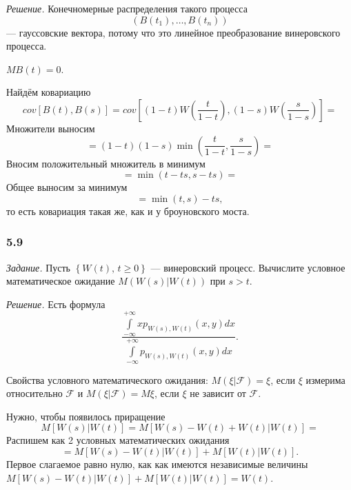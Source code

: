 \textit{Решение.}
Конечномерные распределения такого процесса
$$ \left( B \left( t_1 \right), \dotsc, B \left( t_n \right) \right) $$
--- гауссовские вектора,
потому что это линейное преобразование винеровского процесса.

$MB \left( t \right) = 0$.

Найдём ковариацию
$$cov \left[ B \left( t \right), B \left( s \right) \right] =
  cov \left[
    \left( 1 - t \right) W \left( \frac{t}{1 - t} \right),
    \left( 1 - s \right) W \left( \frac{s}{1 - s} \right) \right] =$$
Множители выносим
$$= \left( 1 - t \right) \left( 1 - s \right)
  \min \left( \frac{t}{1 - t}, \frac{s}{1 - s} \right) =$$
Вносим положительный множитель в минимум
$$= \min \left( t - ts, s - ts \right) =$$
Общее выносим за минимум
$$= \min \left( t, s \right) - ts,$$
то есть ковариация такая же, как и у броуновского моста.

\subsubsection*{5.9}

\textit{Задание.}
Пусть $ \left\{ W \left( t \right), \, t \geq 0 \right\} $ --- винеровский процесс.
Вычислите условное математическое ожидание
$M \left( \left. W \left( s \right) \right| W \left( t \right) \right) $ при $s > t$.

\textit{Решение.}
Есть формула
$$ \frac{ \int \limits_{-\infty }^{+\infty } xp_{W \left( s \right), W \left( t \right) } \left( x, y \right) dx}{ \int \limits_{-\infty }^{+\infty } p_{W \left( s \right), W \left( t \right) } \left( x, y \right) dx}.$$

Свойства условного математического ожидания:
$M \left( \left. \xi \right| \mathcal{F} \right) = \xi $,
если $ \xi $ измерима относительно $ \mathcal{F}$ и
$M \left( \left. \xi \right| \mathcal{F} \right) = M \xi $,
если $ \xi $ не зависит от $ \mathcal{F}$.

Нужно, чтобы появилось приращение
$$M \left[ \left. W \left( s \right) \right| W \left( t \right) \right] =
  M \left[
    \left. W \left( s \right) - W \left( t \right) + W \left( t \right) \right| W \left( t \right)
  \right] =$$
Распишем как 2 условных математических ожидания
$$= M \left[ \left. W \left( s \right) - W \left( t \right) \right| W \left( t \right) \right] +
  M \left[ \left. W \left( t \right) \right| W \left( t \right) \right].$$
Первое слагаемое равно нулю, как как имеются независимые величины
$M \left[ \left. W \left( s \right) - W \left( t \right) \right| W \left( t \right) \right] +
  M \left[ \left. W \left( t \right) \right| W \left( t \right) \right] =
  W \left( t \right) $.

